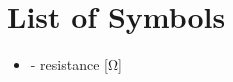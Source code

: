 \chapter*{List of Symbols}

\begin{itemize}[noitemsep,topsep=0pt,parsep=0pt,partopsep=0pt,labelwidth=1cm,align=left,itemindent=0pt]
\item[$R$] - resistance [\si{\ohm}]
\end{itemize}
